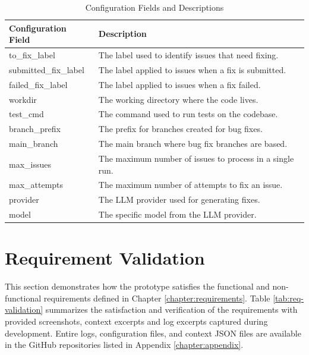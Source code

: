\renewcommand{\arraystretch}{1.5}
\begin{longtable}{@{\extracolsep{\fill}} p{3.5cm} | p{11cm} @{}}
    \caption{Configuration Fields and Descriptions} \label{table:configuration}             \\
    \toprule
    \textbf{Configuration Field} & \textbf{Description}                                     \\
    \midrule
    \endfirsthead

    \bottomrule
    \endfoot

    to\_fix\_label               & The label used to identify issues that need fixing.      \\ \hline
    submitted\_fix\_label        & The label applied to issues when a fix is submitted.     \\ \hline
    failed\_fix\_label           & The label applied to issues when a fix failed.           \\ \hline
    workdir                      & The working directory where the code lives.              \\ \hline
    test\_cmd                    & The command used to run tests on the codebase.           \\ \hline
    branch\_prefix               & The prefix for branches created for bug fixes.           \\ \hline
    main\_branch                 & The main branch where bug fix branches are based.        \\ \hline
    max\_issues                  & The maximum number of issues to process in a single run. \\ \hline
    max\_attempts                & The maximum number of attempts to fix an issue.          \\ \hline
    provider                     & The \ac{LLM} provider used for generating fixes.         \\ \hline
    model                        & The specific model from the \ac{LLM} provider.           \\
\end{longtable}


\section{Requirement Validation}

This section demonstrates how the prototype satisfies the functional and non-functional requirements defined in Chapter \ref{chapter:requirements}. Table \ref{tab:req-validation} summarizes the satisfaction and verification of the requirements with provided screenshots, context excerpts and log excerpts captured during development. Entire logs, configuration files, and context JSON files are available in the GitHub repositories listed in Appendix \ref{chapter:appendix}.

